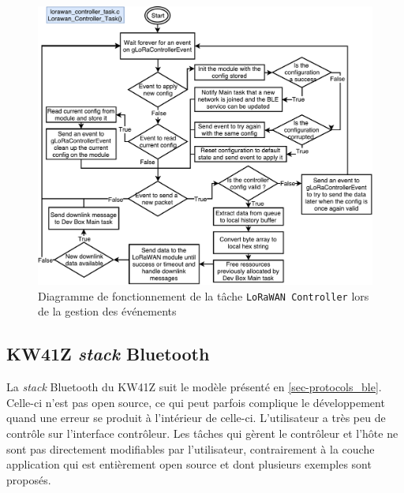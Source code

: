 \begin{figure}[ht!]
    \centering
    \includegraphics[width=1.0\textwidth]{Figures/Software/diagram_lorawan_controller.pdf}
    \caption{Diagramme de fonctionnement de la tâche \texttt{LoRaWAN Controller} lors de la gestion des événements}
    \label{fig-diagram_lorawan_controller}
\end{figure}






\FloatBarrier
\subsection{KW41Z \textit{stack} Bluetooth}
La \textit{stack} Bluetooth du KW41Z suit le modèle présenté en \cref{sec-protocols_ble}. Celle-ci n'est pas open source, ce qui peut parfois complique le développement quand une erreur se produit à l'intérieur de celle-ci. L'utilisateur a très peu de contrôle sur l'interface contrôleur. Les tâches qui gèrent le contrôleur et l'hôte ne sont pas directement modifiables par l'utilisateur, contrairement à la couche application qui est entièrement open source et dont plusieurs exemples sont proposés. \\

